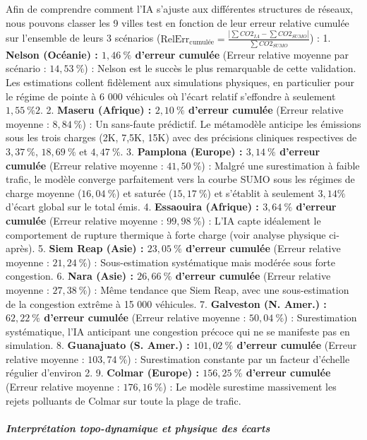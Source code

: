 \documentclass[10pt, a4paper]{article}
\begin{document}
Afin de comprendre comment l'IA s'ajuste aux différentes structures de
réseaux, nous pouvons classer les 9 villes test en fonction de leur
erreur relative cumulée sur l'ensemble de leurs 3 scénarios
(\(\text{RelErr}_{\text{cumulée}} = \frac{|\sum CO2_{IA} - \sum CO2_{SUMO}|}{\sum CO2_{SUMO}}\))
: 1. \textbf{Nelson (Océanie) : \(1,46\ \%\) d'erreur cumulée} (Erreur
relative moyenne par scénario : \(14,53\ \%\)) : Nelson est le succès le
plus remarquable de cette validation. Les estimations collent fidèlement
aux simulations physiques, en particulier pour le régime de pointe à 6
000 véhicules où l'écart relatif s'effondre à seulement \(1,55\ \%2\).
2. \textbf{Maseru (Afrique) : \(2,10\ \%\) d'erreur cumulée} (Erreur
relative moyenne : \(8,84\ \%\)) : Un sans-faute prédictif. Le
métamodèle anticipe les émissions sous les trois charges (2K, 7,5K, 15K)
avec des précisions cliniques respectives de \(3,37\ \%\), \(18,69\ \%\)
et \(4,47\ \%\). 3. \textbf{Pamplona (Europe) : \(3,14\ \%\) d'erreur
cumulée} (Erreur relative moyenne : \(41,50\ \%\)) : Malgré une
surestimation à faible trafic, le modèle converge parfaitement vers la
courbe SUMO sous les régimes de charge moyenne (\(16,04\ \%\)) et
saturée (\(15,17\ \%\)) et s'établit à seulement \(3,14\%\) d'écart
global sur le total émis. 4. \textbf{Essaouira (Afrique) : \(3,64\ \%\)
d'erreur cumulée} (Erreur relative moyenne : \(99,98\ \%\)) : L'IA capte
idéalement le comportement de rupture thermique à forte charge (voir
analyse physique ci-après). 5. \textbf{Siem Reap (Asie) : \(23,05\ \%\)
d'erreur cumulée} (Erreur relative moyenne : \(21,24\ \%\)) :
Sous-estimation systématique mais modérée sous forte congestion. 6.
\textbf{Nara (Asie) : \(26,66\ \%\) d'erreur cumulée} (Erreur relative
moyenne : \(27,38\ \%\)) : Même tendance que Siem Reap, avec une
sous-estimation de la congestion extrême à 15 000 véhicules. 7.
\textbf{Galveston (N. Amer.) : \(62,22\ \%\) d'erreur cumulée} (Erreur
relative moyenne : \(50,04\ \%\)) : Surestimation systématique, l'IA
anticipant une congestion précoce qui ne se manifeste pas en simulation.
8. \textbf{Guanajuato (S. Amer.) : \(101,02\ \%\) d'erreur cumulée}
(Erreur relative moyenne : \(103,74\ \%\)) : Surestimation constante par
un facteur d'échelle régulier d'environ 2. 9. \textbf{Colmar (Europe) :
\(156,25\ \%\) d'erreur cumulée} (Erreur relative moyenne :
\(176,16\ \%\)) : Le modèle surestime massivement les rejets polluants
de Colmar sur toute la plage de trafic.

\subparagraph{Interprétation topo-dynamique et physique des
écarts}\label{interpruxe9tation-topo-dynamique-et-physique-des-uxe9carts}
\end{document}
